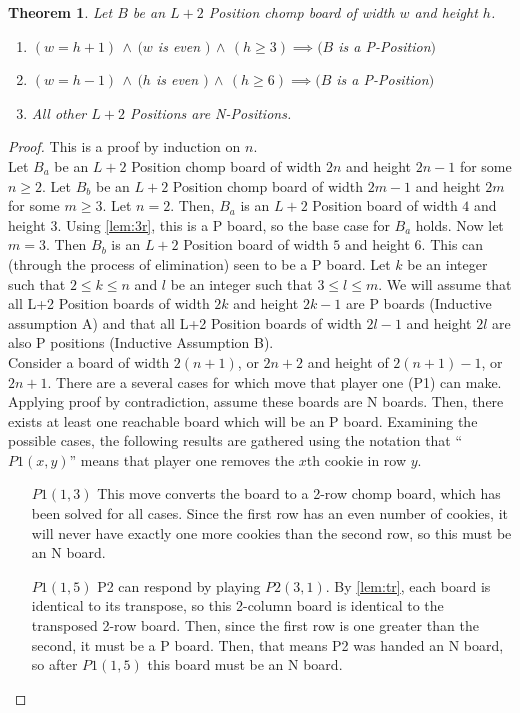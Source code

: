 \documentclass{amsart}
\newtheorem{thm}{Theorem}
\theoremstyle{definition}
\theoremstyle{remark}
\numberwithin{equation}{section}
\begin{document}
\begin{thm}
    \label{almostalmostL}
	Let $B$ be an $L+2$ Position chomp board of width $w$ and height $h$.
	\begin{enumerate}
		\item $(w = h + 1) \,\land\, (w$ is even $)\,\land\,( h \geq 3) \implies (B$ is a P-Position$)$
		\item $(w = h - 1) \,\land\, (h$ is even $)\,\land\,( h \geq 6) \implies (B$ is a P-Position$)$
		\item All other $L+2$ Positions are N-Positions.
	\end{enumerate}
\end{thm}
\clearpage
\begin{proof}
This is a proof by induction on $n$.\\
Let $B_a$ be an $L+2$ Position chomp board of width $2n$ and height $2n-1$ for some $n \geq 2$.  Let $B_b$ be an $L+2$ Position chomp board of width $2m-1$ and height $2m$ for some $m \geq 3$.  Let $n = 2$.  Then, $B_a$ is an $L+2$ Position board of width $4$ and height $3$.  Using \ref{lem:3r}, this is a P board, so the base case for $B_a$ holds.  Now let $m = 3$.  Then $B_b$ is an $L+2$ Position board of width $5$ and height $6$.  This can (through the process of elimination) seen to be a P board.  Let $k$ be an integer such that $2 \leq k \leq n$ and $l$ be an integer such that $3 \leq l \leq m$.  We will assume that all L+2 Position boards of width $2k$ and height $2k-1$ are P boards (Inductive assumption A) and that all L+2 Position boards of width $2l-1$ and height $2l$ are also P positions (Inductive Assumption B).\\
Consider a board of width $2(n+1)$, or $2n+2$ and height of $2(n+1)-1$, or $2n + 1$.  There are a several cases for which move that player one (P1) can make.  Applying proof by contradiction, assume these boards are N boards.  Then, there exists at least one reachable board which will be an P board.  Examining the possible cases, the following results are gathered using the  notation that ``$P1(x,y)$'' means that player one removes the $x$th cookie in row $y$.
\begin{itemize}
	\item [$P1(1, 3)$] This move converts the board to a 2-row chomp board, which has been solved for all cases.  Since the first row has an even number of cookies, it will never have exactly one more cookies than the second row, so this must be an N board.
	\item [$P1(1,5)$] P2 can respond by playing $P2(3,1)$. By \ref{lem:tr}, each board is identical to its transpose, so this 2-column board is identical to the transposed 2-row board.  Then, since the first row is one greater than the second, it must be a P board.  Then, that means P2 was handed an N board, so after $P1(1,5)$ this board must be an N board.

\end{itemize}
\end{proof}
\end{document}
